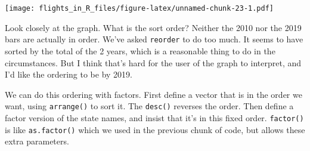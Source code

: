\documentclass[
]{book}
\begin{document}
\texttt{[image: flights\_in\_R\_files/figure-latex/unnamed-chunk-23-1.pdf]}

Look closely at the graph. What is the sort order? Neither the 2010 nor the 2019 bars are actually in order. We've asked \texttt{reorder} to do too much. It seems to have sorted by the total of the 2 years, which is a reasonable thing to do in the circumstances. But I think that's hard for the user of the graph to interpret, and I'd like the ordering to be by 2019.

We can do this ordering with factors. First define a vector that is in the order we want, using \texttt{arrange()} to sort it. The \texttt{desc()} reverses the order. Then define a factor version of the state names, and insist that it's in this fixed order. \texttt{factor()} is like \texttt{as.factor()} which we used in the previous chunk of code, but allows these extra parameters.
\end{document}
